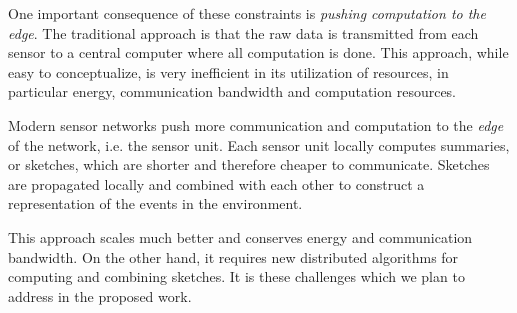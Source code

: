 One important consequence of these constraints is {\em pushing
  computation to the edge}. The traditional approach is that the raw data is transmitted from each sensor to a central computer where all computation is done. This approach, while easy to conceptualize, is very inefficient in its utilization of resources, in particular energy, communication bandwidth and computation resources.
  
  Modern sensor networks push more communication and computation to the {\em edge} of the network, i.e. the sensor unit. Each sensor unit
locally computes summaries, or sketches, which are shorter and
therefore cheaper to communicate. Sketches are propagated locally and combined with each other to construct a representation of the events in the environment. 

This approach scales much better and conserves energy and communication bandwidth. On the other hand, it requires new distributed algorithms for computing and combining sketches. It is these challenges which we plan to address in the proposed work.


